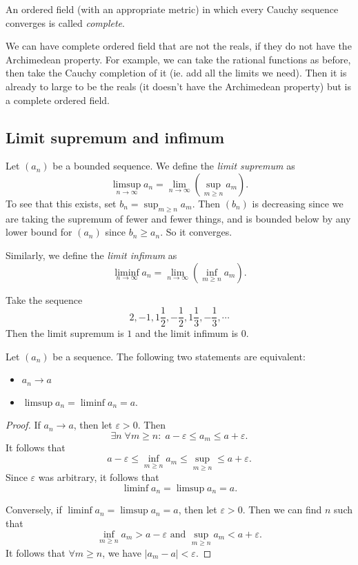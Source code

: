 \documentclass[a4paper]{article}
\begin{document}
\begin{defi}
  An ordered field (with an appropriate metric) in which every Cauchy sequence converges is called \emph{complete}.
\end{defi}
\note We can have complete ordered field that are not the reals, if they do not have the Archimedean property. For example, we can take the rational functions as before, then take the Cauchy completion of it (ie. add all the limits we need). Then it is already to large to be the reals (it doesn't have the Archimedean property) but is a complete ordered field.

\subsection{Limit supremum and infimum}
\begin{defi}
  Let $(a_n)$ be a bounded sequence. We define the \emph{limit supremum} as
  \[
    \limsup_{n\to \infty} a_n = \lim_{n\to \infty}\left(\sup_{m \geq n} a_m\right).
  \]
  To see that this exists, set $b_n = \sup_{m\geq n}a_m$. Then $(b_n)$ is decreasing since we are taking the supremum of fewer and fewer things, and is bounded below by any lower bound for $(a_n)$ since $b_n \geq a_n$. So it converges.

  Similarly, we define the \emph{limit infimum} as
  \[
    \liminf_{n\to \infty}a_n = \lim_{n\to\infty}\left(\inf_{m\geq n} a_m\right).
  \]
\end{defi}

\begin{eg}
  Take the sequence
  \[
    2, -1, 1\frac{1}{2}, -\frac{1}{2}, 1\frac{1}{3}, -\frac{1}{3}, \cdots
  \]
  Then the limit supremum is $1$ and the limit infimum is $0$.
\end{eg}

\begin{lemma}
  Let $(a_n)$ be a sequence. The following two statements are equivalent:
  \begin{itemize}
    \item $a_n\to a$
    \item $\limsup a_n = \liminf a_n = a$.
  \end{itemize}
\end{lemma}

\begin{proof}
  If $a_n \to a$, then let $\varepsilon > 0$. Then
  \[
    \exists n\; \forall m\geq n:\; a - \varepsilon \leq a_m \leq a + \varepsilon.
  \]
  It follows that
  \[
    a - \varepsilon \leq \inf_{m \geq n}a_m \leq \sup_{m\geq n} \leq a + \varepsilon.
  \]
  Since $\varepsilon$ was arbitrary, it follows that
  \[
    \liminf a_n = \limsup a_n = a.
  \]

  Conversely, if $\liminf a_n = \limsup a_n = a$, then let $\varepsilon > 0$. Then we can find $n$ such that
  \[
    \inf_{m\geq n} a_m > a - \varepsilon\text{ and }\sup _{m \geq n} a_m < a + \varepsilon.
  \]
  It follows that $\forall m\geq n$, we have $|a_m - a| < \varepsilon$.
\end{proof}
\end{document}
